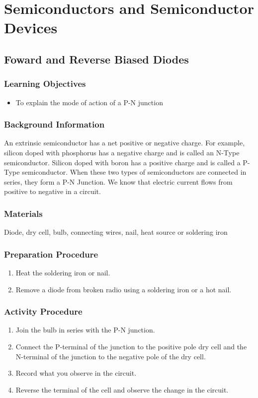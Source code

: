 \section{Semiconductors and Semiconductor Devices}

\subsection{Foward and Reverse Biased Diodes}

\subsubsection*{Learning Objectives}
\begin{itemize}
\item{To explain the mode of action of a P-N junction} 
\end{itemize}

\subsubsection*{Background Information}
An extrinsic semiconductor has a net positive or negative charge. For example, silicon doped with phosphorus has a negative charge and is called an N-Type semiconductor. Silicon doped with boron has a positive charge and is called a P-Type semiconductor. When these two types of semiconductors are connected in series, they form a P-N Junction.  
We know that electric current flows from positive to negative in a circuit.  

\subsubsection*{Materials}
Diode, dry cell, bulb, connecting wires, nail, heat source or soldering iron

\subsubsection*{Preparation Procedure}
\begin{enumerate}
\item{Heat the soldering iron or nail.}
\item{Remove a diode from broken radio using a soldering iron or a hot nail.} 
\end{enumerate}

\subsubsection*{Activity Procedure}
\begin{enumerate}
\item{Join the bulb in series with the P-N junction.} 
\item{Connect the P-terminal of the junction to the positive pole dry cell and the N-terminal of the junction to the negative pole of the dry cell.} 
\item{Record what you observe in the circuit.} 
\item{Reverse the terminal of the cell and observe the change in the circuit.} 
\end{enumerate}

